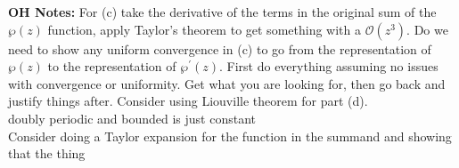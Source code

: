 \documentclass[10pt]{amsart}
\theoremstyle{nonumberplain}
\begin{document}
\begin{enumerate}[label={\bf {\arabic*}:}]
\begin{enumerate}
{\bf OH Notes: }
For (c) take the derivative of the terms in the original sum of the $\wp(z)$ function, apply Taylor's theorem to get something with a $\mathcal O(z^3)$.
Do we need to show any uniform convergence in (c) to go from the representation of $\wp(z)$ to the representation of $\wp^\prime(z)$.
First do everything assuming no issues with convergence or uniformity.
Get what you are looking for, then go back and justify things after.
Consider using Liouville theorem for part (d). \\

\noindent
doubly periodic and bounded is just constant \\

\noindent
Consider doing a Taylor expansion for the function in the summand and showing that the thing

\end{enumerate}
\end{enumerate}
\end{document}
